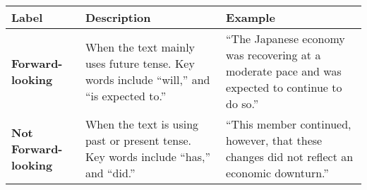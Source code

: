 \begin{table*}
    \caption{}
    \vspace{1em}
    \begin{tabular}{p{}p{}p{}}
    \toprule
    \textbf{Label} & \textbf{Description} & \textbf{Example}\\
    \midrule
    \textbf{Forward-looking} & When the text mainly uses future tense. Key words include ``will,'' and ``is expected to.'' & ``The Japanese economy was recovering at a moderate pace and was expected to continue to do so.'' \\
    \midrule
    \textbf{Not Forward-looking} &  When the text is using past or present tense. Key words include ``has,'' and ``did.'' &  ``This member continued, however, that these changes did not reflect an economic downturn.'' \\
    \bottomrule
    \end{tabular}
    \label{tb:boj_forward_looking_guide}
\end{table*}